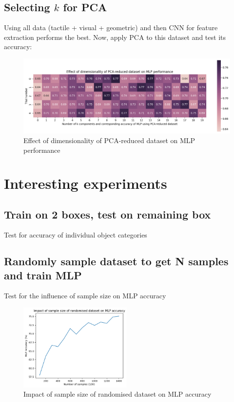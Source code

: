 \documentclass[11pt, a4paper]{report}
\begin{document}
\subsection{Selecting $k$ for PCA}
Using all data (tactile + visual + geometric) and then CNN for feature extraction performs the best. Now, apply PCA to this dataset and test its accuracy:
\begin{figure}[H]
    \centering
    \includegraphics[scale=0.55]{docs/Project Report/Media/mlp_pca_accuracy_analysis.png}
    \caption{Effect of dimensionality of PCA-reduced dataset on MLP performance}
    \label{fig:my_label}
\end{figure}


\section{Interesting experiments}
\subsection{Train on 2 boxes, test on remaining box}
Test for accuracy of individual object categories


\subsection{Randomly sample dataset to get N samples and train MLP}
Test for the influence of sample size on MLP accuracy
\begin{figure}[H]
    \centering
    \includegraphics[width=0.5\textwidth]{docs/Project Report/Media/5_5_2_size_vs_accuracy.png}
    \caption{Impact of sample size of randomised dataset on MLP accuracy}
    \label{fig:my_label}
\end{figure}
\end{document}
